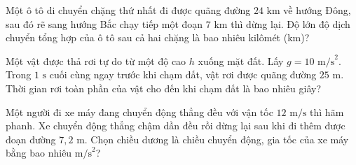 \begin{ex}
	Một ô tô di chuyển chặng thứ nhất đi được quãng đường $24\text{ km}$ về hướng Đông, sau đó rẽ sang hướng Bắc chạy tiếp một đoạn $7\text{ km}$ thì dừng lại. Độ lớn độ dịch chuyển tổng hợp của ô tô sau cả hai chặng là bao nhiêu kilômét (km)?

	\par{}
\end{ex}

\begin{ex}
	Một vật được thả rơi tự do từ một độ cao $h$ xuống mặt đất. Lấy $g = 10\text{ m/s}^2$. Trong $1\text{ s}$ cuối cùng ngay trước khi chạm đất, vật rơi được quãng đường $25\text{ m}$. Thời gian rơi toàn phần của vật cho đến khi chạm đất là bao nhiêu giây?

	\par{}
\end{ex}

\begin{ex}
	Một người đi xe máy đang chuyển động thẳng đều với vận tốc $12\text{ m/s}$ thì hãm phanh. Xe chuyển động thẳng chậm dần đều rồi dừng lại sau khi đi thêm được đoạn đường $7{,}2\text{ m}$. Chọn chiều dương là chiều chuyển động, gia tốc của xe máy bằng bao nhiêu $\text{m/s}^2$?

	\par{}
\end{ex}

